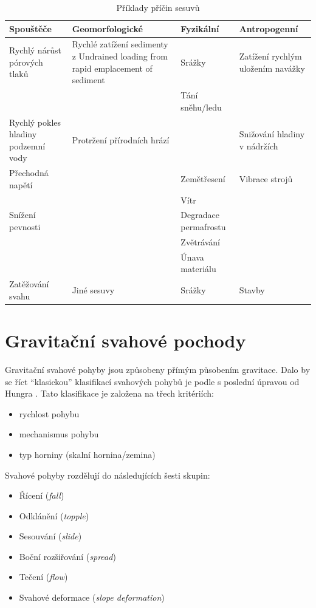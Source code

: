 \begin{table}
\begin{tabularx}{\textwidth}{@{}XXXX@{}}
		\midrule \midrule
		\textbf{Spouštěče} & \textbf{Geomorfologické} & \textbf{Fyzikální} & \textbf{Antropogenní} \\ 
		\midrule
		Rychlý nárůst pórových tlaků  & Rychlé zatížení sedimenty z Undrained loading from rapid emplacement of sediment & Srážky & Zatížení rychlým uložením navážky  \\
		&  &  Tání sněhu/ledu &  \\
		Rychlý pokles hladiny podzemní vody & Protržení přírodních hrází &  & Snižování hladiny v nádržích \\
		Přechodná napětí&  & Zemětřesení& Vibrace strojů \\
		&  & Vítr &  \\
		Snížení pevnosti&  & Degradace permafrostu &  \\
		&  & Zvětrávání &  \\
		&  & Únava materiálu &  \\
		Zatěžování svahu & Jiné sesuvy & Srážky & Stavby \\
		\bottomrule
	\end{tabularx}
		\caption{Příklady příčin sesuvů \parencite[podle][]{mccollLandslideCausesTriggers2015}}
		\label{tab:stabilita_faktory}
	
\end{table}

\section{Gravitační svahové pochody}
Gravitační svahové pohyby jsou způsobeny přímým působením gravitace. Dalo by se říct \enquote{klasickou} klasifikací svahových pohybů je podle \textcite{crudenLandslideTypesProcesses1996} s poslední úpravou od Hungra \parencite*{hungrVarnesClassificationLandslide2014}. Tato klasifikace je založena na třech kritériích:
\begin{itemize}
	\item rychlost pohybu
	\item mechanismus pohybu
	\item typ horniny (skalní hornina/zemina)
\end{itemize}

Svahové pohyby rozdělují do následujících šesti skupin:
\begin{itemize}
	\item Řícení (\textit{fall})
	\item Odklánění (\textit{topple})
	\item Sesouvání (\textit{slide})
	\item Boční rozšiřování (\textit{spread})
	\item Tečení (\textit{flow})
	\item Svahové deformace (\textit{slope deformation})
\end{itemize}

